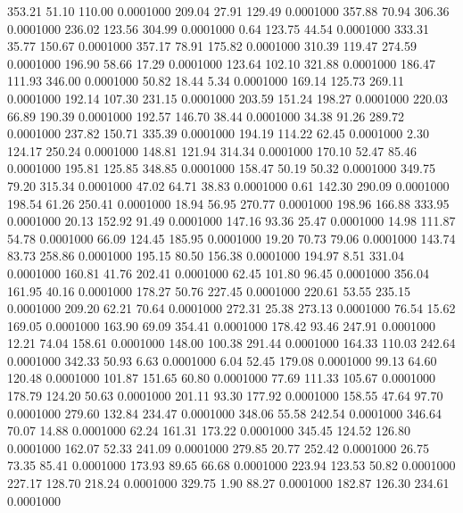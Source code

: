  353.21   51.10  110.00   0.0001000
 209.04   27.91  129.49   0.0001000
 357.88   70.94  306.36   0.0001000
 236.02  123.56  304.99   0.0001000
   0.64  123.75   44.54   0.0001000
 333.31   35.77  150.67   0.0001000
 357.17   78.91  175.82   0.0001000
 310.39  119.47  274.59   0.0001000
 196.90   58.66   17.29   0.0001000
 123.64  102.10  321.88   0.0001000
 186.47  111.93  346.00   0.0001000
  50.82   18.44    5.34   0.0001000
 169.14  125.73  269.11   0.0001000
 192.14  107.30  231.15   0.0001000
 203.59  151.24  198.27   0.0001000
 220.03   66.89  190.39   0.0001000
 192.57  146.70   38.44   0.0001000
  34.38   91.26  289.72   0.0001000
 237.82  150.71  335.39   0.0001000
 194.19  114.22   62.45   0.0001000
   2.30  124.17  250.24   0.0001000
 148.81  121.94  314.34   0.0001000
 170.10   52.47   85.46   0.0001000
 195.81  125.85  348.85   0.0001000
 158.47   50.19   50.32   0.0001000
 349.75   79.20  315.34   0.0001000
  47.02   64.71   38.83   0.0001000
   0.61  142.30  290.09   0.0001000
 198.54   61.26  250.41   0.0001000
  18.94   56.95  270.77   0.0001000
 198.96  166.88  333.95   0.0001000
  20.13  152.92   91.49   0.0001000
 147.16   93.36   25.47   0.0001000
  14.98  111.87   54.78   0.0001000
  66.09  124.45  185.95   0.0001000
  19.20   70.73   79.06   0.0001000
 143.74   83.73  258.86   0.0001000
 195.15   80.50  156.38   0.0001000
 194.97    8.51  331.04   0.0001000
 160.81   41.76  202.41   0.0001000
  62.45  101.80   96.45   0.0001000
 356.04  161.95   40.16   0.0001000
 178.27   50.76  227.45   0.0001000
 220.61   53.55  235.15   0.0001000
 209.20   62.21   70.64   0.0001000
 272.31   25.38  273.13   0.0001000
  76.54   15.62  169.05   0.0001000
 163.90   69.09  354.41   0.0001000
 178.42   93.46  247.91   0.0001000
  12.21   74.04  158.61   0.0001000
 148.00  100.38  291.44   0.0001000
 164.33  110.03  242.64   0.0001000
 342.33   50.93    6.63   0.0001000
   6.04   52.45  179.08   0.0001000
  99.13   64.60  120.48   0.0001000
 101.87  151.65   60.80   0.0001000
  77.69  111.33  105.67   0.0001000
 178.79  124.20   50.63   0.0001000
 201.11   93.30  177.92   0.0001000
 158.55   47.64   97.70   0.0001000
 279.60  132.84  234.47   0.0001000
 348.06   55.58  242.54   0.0001000
 346.64   70.07   14.88   0.0001000
  62.24  161.31  173.22   0.0001000
 345.45  124.52  126.80   0.0001000
 162.07   52.33  241.09   0.0001000
 279.85   20.77  252.42   0.0001000
  26.75   73.35   85.41   0.0001000
 173.93   89.65   66.68   0.0001000
 223.94  123.53   50.82   0.0001000
 227.17  128.70  218.24   0.0001000
 329.75    1.90   88.27   0.0001000
 182.87  126.30  234.61   0.0001000
